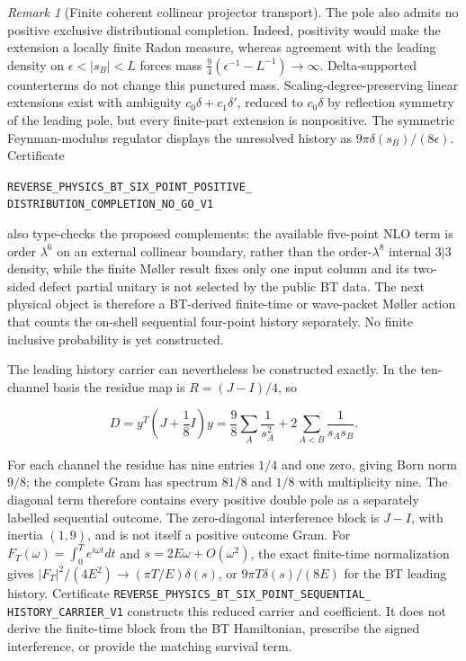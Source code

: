 \documentclass[11pt]{article}
\theoremstyle{definition}
\theoremstyle{remark}
\newtheorem{remark}[theorem]{Remark}
\begin{document}
\begin{remark}[Finite coherent collinear projector transport]
The pole also admits no positive exclusive distributional completion.  Indeed,
positivity would make the extension a locally finite Radon measure, whereas
agreement with the leading density on
$\epsilon<|s_B|<L$ forces mass
$\frac94(\epsilon^{-1}-L^{-1})\to\infty$.  Delta-supported counterterms do not
change this punctured mass.  Scaling-degree-preserving linear extensions exist
with ambiguity $c_0\delta+c_1\delta'$, reduced to $c_0\delta$ by reflection
symmetry of the leading pole, but every finite-part extension is nonpositive.
The symmetric Feynman-modulus regulator displays the unresolved history as
$9\pi\delta(s_B)/(8\epsilon)$.  Certificate
\par\noindent
\texttt{REVERSE\_PHYSICS\_BT\_SIX\_POINT\_POSITIVE\_}
\allowbreak\texttt{DISTRIBUTION\_COMPLETION\_NO\_GO\_V1}
\par\noindent
also type-checks the proposed complements: the available five-point NLO term
is order $\lambda^6$ on an external collinear boundary, rather than the
order-$\lambda^8$ internal $3|3$ density, while the finite Møller result fixes
only one input column and its two-sided defect partial unitary is not selected
by the public BT data.  The next physical object is therefore a BT-derived
finite-time or wave-packet Møller action that counts the on-shell sequential
four-point history separately.  No finite inclusive probability is yet
constructed.

The leading history carrier can nevertheless be constructed exactly.  In the
ten-channel basis the residue map is $R=(J-I)/4$, so

\[
 D=y^T\left(J+\frac18I\right)y
  =\frac98\sum_A\frac1{s_A^2}
   +2\sum_{A<B}\frac1{s_As_B}.
\]

For each channel the residue has nine entries $1/4$ and one zero, giving Born
norm $9/8$; the complete Gram has spectrum $81/8$ and $1/8$ with multiplicity
nine.  The diagonal term therefore contains every positive double pole as a
separately labelled sequential outcome.  The zero-diagonal interference block
is $J-I$, with inertia $(1,9)$, and is not itself a positive outcome Gram.  For
$F_T(\omega)=\int_0^T e^{i\omega t}dt$ and
$s=2E\omega+O(\omega^2)$, the exact finite-time normalization gives
$|F_T|^2/(4E^2)\to(\pi T/E)\delta(s)$, or
$9\pi T\delta(s)/(8E)$ for the BT leading history.  Certificate
\texttt{REVERSE\_PHYSICS\_BT\_SIX\_POINT\_SEQUENTIAL\_}
\allowbreak\texttt{HISTORY\_CARRIER\_V1}
constructs this reduced carrier and coefficient.  It does not derive the
finite-time block from the BT Hamiltonian, prescribe the signed interference,
or provide the matching survival term.


\end{remark}
\end{document}
